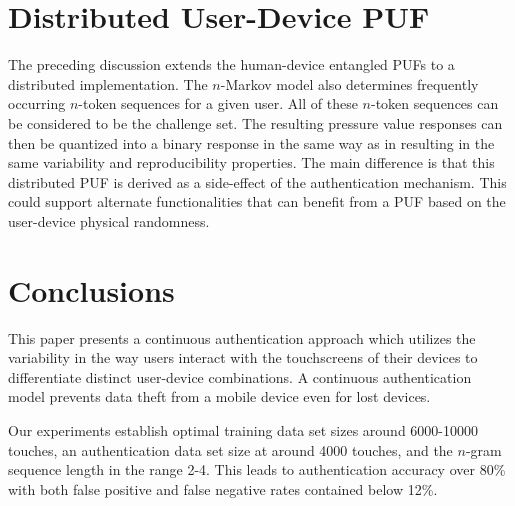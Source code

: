 \documentclass{acm_proc_article-sp}
\begin{document}
\section{Distributed User-Device PUF}
\label{sec:PUF}
The preceding discussion extends the human-device entangled PUFs \cite{ScheelTyagi15} to a distributed
implementation. The $n$-Markov model also determines frequently occurring $n$-token sequences for a
given user. All of these $n$-token sequences can be considered to be the challenge set. The resulting
pressure value responses can then be quantized into a binary response in the same way as in 
\cite{ScheelTyagi15} resulting in the same variability and reproducibility properties. The main 
difference is that this distributed PUF is derived as a side-effect of the authentication mechanism.
This could support alternate functionalities that can benefit from a PUF based on the user-device 
physical randomness.

\section{Conclusions}
\label{sec:conclusions}
This paper presents a continuous authentication approach which utilizes the variability in the way users interact with the touchscreens of their devices to differentiate distinct user-device combinations. 
A continuous authentication model prevents data theft from a mobile device even for lost devices.

Our experiments establish optimal training data set sizes around 6000-10000 touches, an authentication
data set size at around 4000 touches, and the $n$-gram sequence length in the range 2-4. This leads to
authentication accuracy over 80\% with both false positive and false negative rates contained
below 12\%.



%



%
\end{document}
